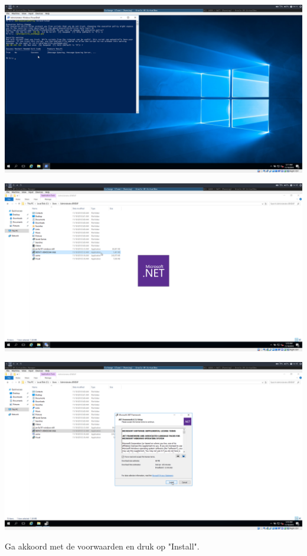 \documentclass[a4paper]{article}
\begin{document}
	\begin{center}
	\includegraphics[width=15cm]{Pictures/Exchange/Pre/1542633119.png}
\end{center}
	\begin{center}
	\includegraphics[width=15cm]{Pictures/Exchange/Pre/1542633495.png}
\end{center}
	\begin{center}
	\includegraphics[width=15cm]{Pictures/Exchange/Pre/1542633503.png}
	
		Ga akkoord met de voorwaarden en druk op "Install".
\end{center}
\end{document}
